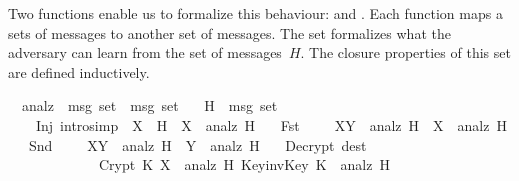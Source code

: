\begin{isabellebody}
\begin{isamarkuptext}
Two functions enable us to formalize this behaviour:  and
.  Each function maps a sets of messages to another set of
messages. The set  formalizes what the adversary can learn
from the set of messages~$H$.  The closure properties of this set are
defined inductively.%
\end{isamarkuptext}%
\isamarkuptrue%
\isamarkupfalse%
\isanewline
\ \ analz\ {}{}\ {}msg\ set\ {}\ msg\ set{}\isanewline
\ \ \ H\ {}{}\ {}msg\ set{}\isanewline
\ \ \isanewline
\ \ \ \ Inj\ {}intro{}simp{}\ {}\ {}X\ {}\ H\ {}\ X\ {}\ analz\ H{}\isanewline
\ \ {}\ Fst{}\ \ \ \ \ {}{}X{}Y{}\ {}\ analz\ H\ {}\ X\ {}\ analz\ H{}\isanewline
\ \ {}\ Snd{}\ \ \ \ \ {}{}X{}Y{}\ {}\ analz\ H\ {}\ Y\ {}\ analz\ H{}\isanewline
\ \ {}\ Decrypt\ {}dest{}{}\ \isanewline
\ \ \ \ \ \ \ \ \ \ \ \ \ {}{}Crypt\ K\ X\ {}\ analz\ H{}\ Key{}invKey\ K{}\ {}\ analz\ H{}\isanewline

\end{isabellebody}
